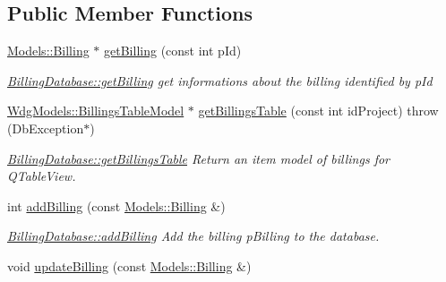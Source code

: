 \subsection*{Public Member Functions}
\begin{DoxyCompactItemize}
\item 
\hyperlink{classModels_1_1Billing}{Models\-::\-Billing} $\ast$ \hyperlink{classDatabases_1_1BillingDatabase_a835d4ca35a046fe1d0b336a1b8cf8f85}{get\-Billing} (const int p\-Id)
\begin{DoxyCompactList}\small\item\em \hyperlink{classDatabases_1_1BillingDatabase_a835d4ca35a046fe1d0b336a1b8cf8f85}{Billing\-Database\-::get\-Billing} get informations about the billing identified by {\itshape p\-Id} \end{DoxyCompactList}\item 
\hyperlink{classGui_1_1Widgets_1_1WdgModels_1_1BillingsTableModel}{Wdg\-Models\-::\-Billings\-Table\-Model} $\ast$ \hyperlink{classDatabases_1_1BillingDatabase_ade754e6aa116aa75606cf24474631322}{get\-Billings\-Table} (const int id\-Project)  throw (\-Db\-Exception$\ast$)
\begin{DoxyCompactList}\small\item\em \hyperlink{classDatabases_1_1BillingDatabase_ade754e6aa116aa75606cf24474631322}{Billing\-Database\-::get\-Billings\-Table} Return an item model of billings for Q\-Table\-View. \end{DoxyCompactList}\item 
int \hyperlink{classDatabases_1_1BillingDatabase_a656c622366884194a6823b679d7d2f63}{add\-Billing} (const \hyperlink{classModels_1_1Billing}{Models\-::\-Billing} \&)
\begin{DoxyCompactList}\small\item\em \hyperlink{classDatabases_1_1BillingDatabase_a656c622366884194a6823b679d7d2f63}{Billing\-Database\-::add\-Billing} Add the billing {\itshape p\-Billing} to the database. \end{DoxyCompactList}\item 
\hypertarget{classDatabases_1_1BillingDatabase_a74643c7e242cfe6fc294985984d6a65f}{void \hyperlink{classDatabases_1_1BillingDatabase_a74643c7e242cfe6fc294985984d6a65f}{update\-Billing} (const \hyperlink{classModels_1_1Billing}{Models\-::\-Billing} \&)}\label{classDatabases_1_1BillingDatabase_a74643c7e242cfe6fc294985984d6a65f}


\end{DoxyCompactItemize}
